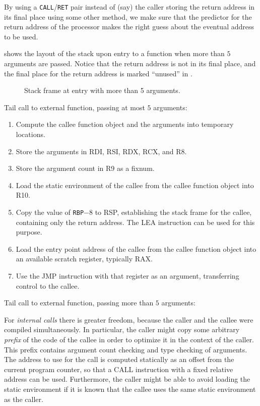By using a \texttt{CALL}/\texttt{RET} pair instead of (say) the caller
storing the return address in its final place using some other method,
we make sure that the predictor for the return address of the
processor makes the right guess about the eventual address to be used.

 shows the layout of the stack
upon entry to a function when more than $5$ arguments are passed.
Notice that the return address is not in its final place, and the
final place for the return address is marked ``unused'' in
.

\begin{figure}
\begin{center}
\end{center}
\caption{\label{fig-x86-64-stack-frame-at-entry}
Stack frame at entry with more than 5 arguments.}
\end{figure}

Tail call to external function, passing at most $5$ arguments:

\begin{enumerate}
\item Compute the callee function object and the arguments into
  temporary locations.
\item Store the arguments in RDI, RSI, RDX, RCX, and R8.
\item Store the argument count in R9 as a fixnum.
\item Load the static environment of the callee from the callee
  function object into R10.
\item Copy the value of \texttt{RBP}$ - 8$ to RSP, establishing the stack frame
  for the callee, containing only the return address.  The LEA
  instruction can be used for this purpose.
\item Load the entry point address of the callee from the callee
  function object into an available scratch register, typically RAX.
\item Use the JMP instruction with that register as an argument,
  transferring control to the callee.
\end{enumerate}

Tail call to external function, passing more than $5$ arguments:%

For \emph{internal calls} there is greater freedom, because the caller
and the callee were compiled simultaneously.  In particular, the
caller might copy some arbitrary \emph{prefix} of the code of the
callee in order to optimize it in the context of the caller.  This
prefix contains argument count checking and type checking of
arguments.  The address to use for the call is computed statically as
an offset from the current program counter, so that a CALL instruction
with a fixed relative address can be used.  Furthermore, the caller
might be able to avoid loading the static environment if it is known
that the callee uses the same static environment as the caller.

